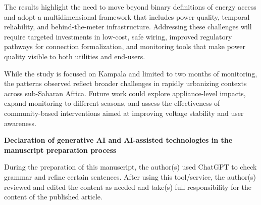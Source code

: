 \documentclass[review]{elsarticle}
\begin{document}
The results highlight the need to move beyond binary definitions of energy access and adopt a multidimensional framework that includes power quality, temporal reliability, and behind-the-meter infrastructure. Addressing these challenges will require targeted investments in low-cost, safe wiring, improved regulatory pathways for connection formalization, and monitoring tools that make power quality visible to both utilities and end-users.

While the study is focused on Kampala and limited to two months of monitoring, the patterns observed reflect broader challenges in rapidly urbanizing contexts across sub-Saharan Africa. Future work could explore appliance-level impacts, expand monitoring to different seasons, and assess the effectiveness of community-based interventions aimed at improving voltage stability and user awareness.


\textbf{Declaration of generative AI and AI-assisted technologies in the manuscript preparation process}

During the preparation of this manuscript, the author(s) used ChatGPT to check grammar and refine certain sentences. After using this tool/service, the author(s) reviewed and edited the content as needed and take(s) full responsibility for the content of the published article.

 
\end{document}
